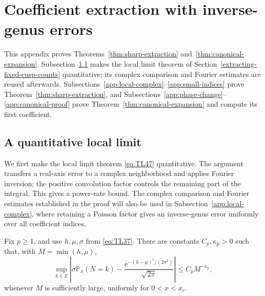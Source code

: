 \section{Coefficient extraction with inverse-genus errors}\label{app:extraction}

This appendix proves Theorems~\ref{thm:sharp-extraction}
and~\ref{thm:canonical-expansion}. Subsection~\ref{sec:quantitative-local}
makes the local limit theorem of Section~\ref{extracting-fixed-cusp-counts}
quantitative; its complex comparison and Fourier estimates are reused
afterwards. Subsections~\ref{app:local-complex}--\ref{app:small-indices}
prove Theorem~\ref{thm:sharp-extraction}, and
Subsections~\ref{app:phase-change}--\ref{app:canonical-proof} prove
Theorem~\ref{thm:canonical-expansion} and compute its first coefficient.

\subsection{A quantitative local limit}\label{sec:quantitative-local}

We first make the local limit theorem \eqref{eq:TL47} quantitative. The argument transfers a real-axis error to a complex neighborhood and applies Fourier inversion; the positive convolution factor controls the remaining part of the integral. This gives a power-rate bound. The complex comparison and Fourier estimates established in the proof will also be used in Subsection~\ref{app:local-complex}, where retaining a Poisson factor gives an inverse-genus error uniformly over all coefficient indices.

\begin{proposition}\label{prop:quantitative-local}
Fix $p\ge1$, and use $h,\mu,\sigma$ from \eqref{eq:TL37}. There are
constants $C_p,\kappa_p>0$ such that, with $M=\min(h,\mu)$,
\begin{equation}
 \sup_{k\in\mathbb Z}
 \left|\sigma\mathbb P_x(N=k)-
 \frac{\mathrm{e}^{-(k-\mu)^2/(2\sigma^2)}}{\sqrt{2\pi}}\right|
 \le C_p M^{-\kappa_p},
 \label{eq:QL1}
\end{equation}
whenever $M$ is sufficiently large, uniformly for $0<x<x_c$.
\end{proposition}

